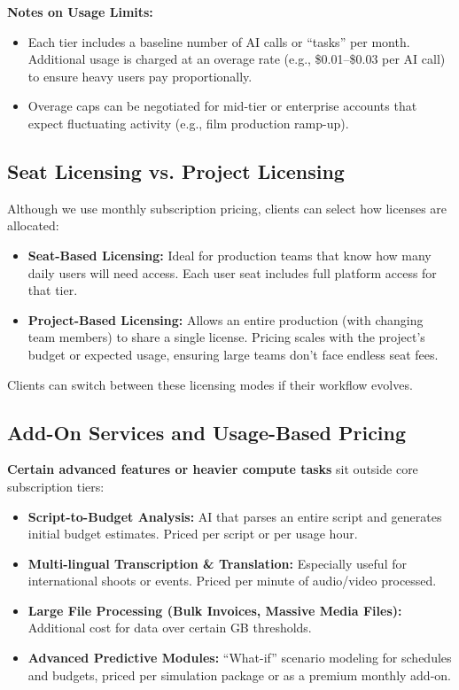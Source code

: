 \documentclass[11pt]{article}
\begin{document}
\textbf{Notes on Usage Limits:}
\begin{itemize}
    \item Each tier includes a baseline number of AI calls or “tasks” per month. Additional usage is charged at an overage rate (e.g., \$0.01--\$0.03 per AI call) to ensure heavy users pay proportionally.
    \item Overage caps can be negotiated for mid-tier or enterprise accounts that expect fluctuating activity (e.g., film production ramp-up).
\end{itemize}

\subsection{Seat Licensing vs. Project Licensing}
Although we use monthly subscription pricing, clients can select how licenses are allocated:
\begin{itemize}
    \item \textbf{Seat-Based Licensing:} Ideal for production teams that know how many daily users will need access. Each user seat includes full platform access for that tier.
    \item \textbf{Project-Based Licensing:} Allows an entire production (with changing team members) to share a single license. Pricing scales with the project’s budget or expected usage, ensuring large teams don’t face endless seat fees.
\end{itemize}
Clients can switch between these licensing modes if their workflow evolves.

\subsection{Add-On Services and Usage-Based Pricing}
\textbf{Certain advanced features or heavier compute tasks} sit outside core subscription tiers:
\begin{itemize}
    \item \textbf{Script-to-Budget Analysis:} AI that parses an entire script and generates initial budget estimates. Priced per script or per usage hour.
    \item \textbf{Multi-lingual Transcription \& Translation:} Especially useful for international shoots or events. Priced per minute of audio/video processed.
    \item \textbf{Large File Processing (Bulk Invoices, Massive Media Files):} Additional cost for data over certain GB thresholds.
    \item \textbf{Advanced Predictive Modules:} “What-if” scenario modeling for schedules and budgets, priced per simulation package or as a premium monthly add-on.
\end{itemize}
\end{document}
